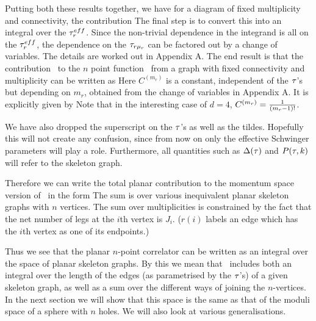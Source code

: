 Putting both these results together, we have for a diagram of
fixed multiplicity and connectivity, the contribution
\eqn{} The final step is to convert this into an integral over
the ${\tau}^{eff}_r$. Since the non-trivial dependence in the
integrand is all on the ${\tau}^{eff}_r$, the dependence on the
${\tau}_{r{\mu}_r}$ can be factored out by a change of variables. The
details are worked out in Appendix A. The end result
is that the contribution \contr\ to the $n$ point function \ncorr\
from a graph with fixed connectivity and multiplicity can be
written as
%
\eqn{}
%
Here $C^{(m_r)}$ is a constant, independent of the ${\tau}$'s but
depending on $m_r$, obtained from the change of variables in
Appendix A. It is explicitly given by
\eqn{} Note
that in the interesting case of $d=4$, $C^{(m_r)}={1\over
(m_r-1)!}$.

We have also dropped the superscript on the ${\tau}$'s as well as the
tildes. Hopefully this will not create any confusion, since from
now on only the effective Schwinger parameters will play a role.
Furthermore, all quantities such as ${\Delta}({\tau})$ and $P({\tau}, k)$ will
refer to the skeleton graph.

Therefore we can write the total planar contribution to the
momentum space version of \ncorr\ in the form
\eqn{} The sum is over various inequivalent
planar skeleton graphs with $n$ vertices. The sum over
multiplicities is constrained by the fact that the net number of
legs at the $i$th vertex  is $J_i$. ($r(i)$ labels an edge which
has the $i$th vertex as one of its endpoints.)

Thus we see that the planar $n$-point correlator can be written as
an integral over the space of planar skeleton graphs. By this we
mean that \totcont\ includes both an integral over the length of
the edges (as parametrised by the ${\tau}$'s) of a given skeleton
graph, as well as a sum over the different ways of joining the
$n$-vertices. In the next section we will show that this space is
the same as that of the moduli space of a sphere with $n$ holes.
We will also look at various generalisations.

